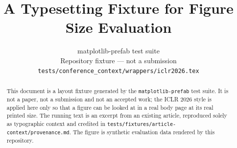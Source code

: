 \documentclass{article}
\title{A Typesetting Fixture for Figure Size Evaluation}
\author{%
matplotlib-prefab test suite \\
Repository fixture --- not a submission \\
\texttt{tests/conference\_context/wrappers/iclr2026.tex}
}
\begin{document}
\maketitle


\begin{abstract}
This document is a layout fixture generated by the \texttt{matplotlib-prefab}
test suite. It is not a paper, not a submission and not an accepted work; the
ICLR 2026 style is applied here only so that a figure can be looked at in a real
body page at its real printed size. The running text is an excerpt from an
existing article, reproduced solely as typographic context and credited in
\texttt{tests/fixtures/article-context/provenance.md}. The figure is synthetic
evaluation data rendered by this repository.
\end{abstract}





\end{document}
